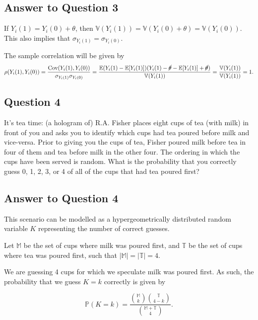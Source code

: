 \documentclass[
  letterpaper,
  DIV=11,
  numbers=noendperiod]{scrartcl}
\newcommand{\E}{\mathbb{E}}
\newcommand{\V}{\mathbb{V}}
\renewcommand{\P}{\mathbb{P}}
\begin{document}
\hypertarget{answer-to-question-3}{%
\subsection{Answer to Question 3}\label{answer-to-question-3}}

If \(Y_i(1) = Y_i(0) + \theta\), then
\(\V(Y_i(1)) = \V(Y_i(0) + \theta) = \V(Y_i(0))\). This also implies
that \(\sigma_{Y_i(1)} = \sigma_{Y_i(0)}\).

The sample correlation will be given by \[
\rho(Y_i(1), Y_i(0)) = 
\frac{\text{Cov}(Y_i(1), Y_i(0))}{\sigma_{Y_i(1)} \sigma_{Y_i(0)}} = \\ 
\frac{\E(Y_i(1) - \E[Y_i(1)])(Y_i(1) - \cancel{\theta} - \E[Y_i(1)] + \cancel{\theta})}{\V(Y_i(1))} = 
\frac{\V(Y_i(1))}{\V(Y_i(1))} = 1.
\]

\newpage

\hypertarget{question-4}{%
\subsection{Question 4}\label{question-4}}

It's tea time: (a hologram of) R.A. Fisher places eight cups of tea
(with milk) in front of you and asks you to identify which cups had tea
poured before milk and vice-versa. Prior to giving you the cups of tea,
Fisher poured milk before tea in four of them and tea before milk in the
other four. The ordering in which the cups have been served is random.
What is the probability that you correctly guess 0, 1, 2, 3, or 4 of all
of the cups that had tea poured first?

\hypertarget{answer-to-question-4}{%
\subsection{Answer to Question 4}\label{answer-to-question-4}}

This scenario can be modelled as a hypergeometrically distributed random
variable \(K\) representing the number of correct guesses.

Let \(\mathbb M\) be the set of cups where milk was poured first, and
\(\mathbb T\) be the set of cups where tea was poured first, such that
\(|\mathbb M| = |\mathbb T| = 4\).

We are guessing 4 cups for which we speculate milk was poured first. As
such, the probability that we guess \(K = k\) correctly is given by

\[\P(K = k) = \frac{{\mathbb M \choose k} {\mathbb T \choose 4-k}}{{\mathbb M + \mathbb T \choose 4}}.
\]
\end{document}
